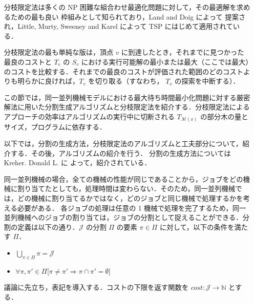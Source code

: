 \documentclass[12pt]{optlab-bachelor}
\begin{document}
分枝限定法は多くの NP 困難な組合わせ最適化問題に対して，その最適解を求めるための最も良い
枠組みとして知られており，Land and Doig \cite{BandB} によって
提案され，Little, Murty, Sweeney and Karel \cite{BandB2}
によって TSP にはじめて適用されている．

分枝限定法の最も単純な版は，頂点 $v$ に到達したとき，それまでに見つかった最良のコストと $T_v$
の $S_v$ における実行可能解の最小または最大（ここでは最大）のコストを比較する．それまでの最良のコストが評価された範囲のどのコストよりも明らかに良ければ，$T_v$ を切り取る（すなわち， $T_v$ の探索を中断する）．


この節では，同一並列機械モデルにおける最大待ち時間最小化問題に対する厳密解法に用いた分割生成アルゴリズムと分枝限定法を紹介する．分枝限定法によるアプローチの効率はアルゴリズムの実行中に切断される $T_{\mathcal{M}(x)}$ の部分木の量とサイズ，プログラムに依存する．%

以下では，分割の生成方法，分枝限定法のアルゴリズムと工夫部分について，紹介する．その後，アルゴリズムの紹介を行う．
分割の生成方法については Kreher. Donald L. \cite{rgf} に
よって，紹介されている．

同一並列機械の場合，全ての機械の性能が同じであることから，ジョブをどの機械に割り当てたとしても，処理時間は変わらない．そのため，同一並列機械では，どの機械に割り当てるかではなく，どのジョブと同じ機械で処理するかを考える必要がある．
各ジョブの処理は任意の 1 機械で処理を完了するため，同一並列機械へのジョブの割り当ては，ジョブの分割として捉えることができる．分割の定義は以下の通り．$\mathcal{J}$ の分割 $\Pi$ の要素 $\pi \in \Pi$ に対して，以下の条件を満たす $\Pi$．
\begin{itemize}
  \item $\displaystyle \bigcup_{\pi \in \Pi}\pi = \mathcal{J} $
  \item $\forall \pi, \pi' \in \Pi \big[\pi \neq \pi' \Rightarrow \pi \cap \pi' = \emptyset \big]$
\end{itemize}

議論に先立ち，表記を導入する．コストの下限を返す関数を $cost : \mathcal{J} \to \mathbb{N}$ とする．
\end{document}
